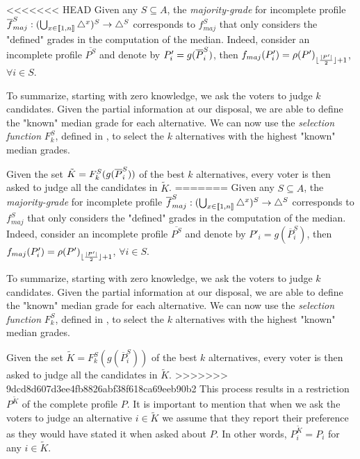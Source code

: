\documentclass[version=3.21, pagesize, twoside=off, bibliography=totoc, DIV=calc, fontsize=12pt, a4paper]{scrartcl}
\begin{document}

<<<<<<< HEAD
Given any $S \subseteq A$, the \emph{majority-grade} for incomplete profile $\overline{f}^S_{maj}: (\bigcup_{x \in \llbracket1,n\rrbracket}\triangle^{x})^S \rightarrow \triangle^S$ corresponds to $f^S_{maj}$ that only considers the "defined" grades in the computation of the median. Indeed, consider an incomplete profile $\overline{P^S}$ and denote by $P'_i=g(\overline{P}^S_i)$, then ${f}_{maj}(P'_i) = \rho(P')_{\lfloor\frac{\lvert P'\rvert}{2}\rfloor + 1}$, $\forall i \in S$.

To summarize, starting with zero knowledge, we ask the voters to judge $k$ candidates. Given the partial information at our disposal, we are able to define the "known" median grade for each alternative. We can now use the \emph{selection function} $F^S_k$, defined in , to select the $k$ alternatives with the highest "known" median grades.

Given the set $\tilde{K}=F^S_k(g(\overline{P}^S_i))$ of the best $k$ alternatives, every voter is then asked to judge all the candidates in $\tilde{K}$. 
=======
Given any $S \subseteq A$, the \emph{majority-grade} for incomplete profile $\overline{f}^S_{maj}: (\bigcup_{x \in \llbracket1,n\rrbracket}\triangle^{x})^S \rightarrow \triangle^S$ corresponds to $f^S_{maj}$ that only considers the "defined" grades in the computation of the median. Indeed, consider an incomplete profile $\overline{P^S}$ and denote by $P'_i=g(\overline{P}^S_i)$, then ${f}_{maj}(P'_i) = \rho(P')_{\lfloor\frac{\lvert P'\rvert}{2}\rfloor + 1}$, $\forall i \in S$.

To summarize, starting with zero knowledge, we ask the voters to judge $k$ candidates. Given the partial information at our disposal, we are able to define the "known" median grade for each alternative. We can now use the \emph{selection function} $F^S_k$, defined in , to select the $k$ alternatives with the highest "known" median grades.

Given the set $\tilde{K}=F^S_k(g(\overline{P}^S_i))$ of the best $k$ alternatives, every voter is then asked to judge all the candidates in $\tilde{K}$. 
>>>>>>> 9dcd8d607d3ee4fb8826abf38f618ca69eeb90b2
This process results in a restriction $P^{\tilde{K}}$ of the complete profile $P$. It is important to mention that when we ask the voters to judge an alternative $i\in \tilde{K}$ we assume that they report their preference as they would have stated it when asked about $P$. In other words, $P^{\tilde{K}}_{i} = P_i$ for any $i \in \tilde{K}$.
\end{document}
